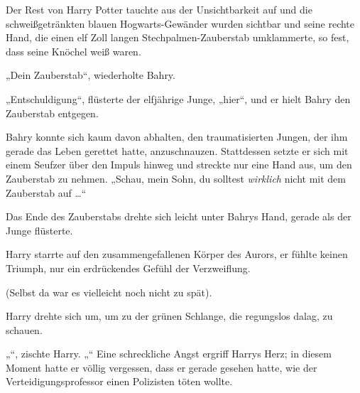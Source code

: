 Der Rest von Harry Potter tauchte aus der Unsichtbarkeit auf und die schweißgetränkten blauen Hogwarts-Gewänder wurden sichtbar und seine rechte Hand, die einen elf Zoll langen Stechpalmen-Zauberstab umklammerte, so fest, dass seine Knöchel weiß waren.

„Dein Zauberstab“, wiederholte Bahry.

„Entschuldigung“, flüsterte der elfjährige Junge, „hier“, und er hielt Bahry den Zauberstab entgegen.

Bahry konnte sich kaum davon abhalten, den traumatisierten Jungen, der ihm gerade das Leben gerettet hatte, anzuschnauzen. Stattdessen setzte er sich mit einem Seufzer über den Impuls hinweg und streckte nur eine Hand aus, um den Zauberstab zu nehmen.
„Schau, mein Sohn, du solltest \emph{wirklich} nicht mit dem Zauberstab auf …“

Das Ende des Zauberstabs drehte sich leicht unter Bahrys Hand, gerade als der Junge  flüsterte.

\later

Harry starrte auf den zusammengefallenen Körper des Aurors, er fühlte keinen Triumph, nur ein erdrückendes Gefühl der Verzweiflung.

(Selbst da war es vielleicht noch nicht zu spät).

Harry drehte sich um, um zu der grünen Schlange, die regungslos dalag, zu schauen.

„“, zischte Harry. „“ Eine schreckliche Angst ergriff Harrys Herz; in diesem Moment hatte er völlig vergessen, dass er gerade gesehen hatte, wie der Verteidigungsprofessor einen Polizisten töten wollte.

